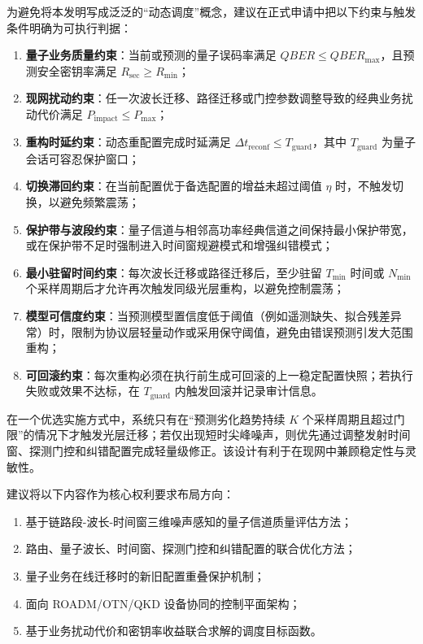 \documentclass[12pt,a4paper]{article}
\begin{document}
为避免将本发明写成泛泛的“动态调度”概念，建议在正式申请中把以下约束与触发条件明确为可执行判据：
\begin{enumerate}[label=(\arabic*)]
    \item \textbf{量子业务质量约束}：当前或预测的量子误码率满足 $QBER \leq QBER_{\max}$，且预测安全密钥率满足 $R_{\mathrm{sec}} \geq R_{\min}$；
    \item \textbf{现网扰动约束}：任一次波长迁移、路径迁移或门控参数调整导致的经典业务扰动代价满足 $P_{\mathrm{impact}} \leq P_{\max}$；
    \item \textbf{重构时延约束}：动态重配置完成时延满足 $\Delta t_{\mathrm{reconf}} \leq T_{\mathrm{guard}}$，其中 $T_{\mathrm{guard}}$ 为量子会话可容忍保护窗口；
    \item \textbf{切换滞回约束}：在当前配置优于备选配置的增益未超过阈值 $\eta$ 时，不触发切换，以避免频繁震荡；
    \item \textbf{保护带与波段约束}：量子信道与相邻高功率经典信道之间保持最小保护带宽，或在保护带不足时强制进入时间窗规避模式和增强纠错模式；
    \item \textbf{最小驻留时间约束}：每次波长迁移或路径迁移后，至少驻留 $T_{\min}$ 时间或 $N_{\min}$ 个采样周期后才允许再次触发同级光层重构，以避免控制震荡；
    \item \textbf{模型可信度约束}：当预测模型置信度低于阈值（例如遥测缺失、拟合残差异常）时，限制为协议层轻量动作或采用保守阈值，避免由错误预测引发大范围重构；
    \item \textbf{可回滚约束}：每次重构必须在执行前生成可回滚的上一稳定配置快照；若执行失败或效果不达标，在 $T_{\mathrm{guard}}$ 内触发回滚并记录审计信息。
\end{enumerate}

在一个优选实施方式中，系统只有在“预测劣化趋势持续 $K$ 个采样周期且超过门限”的情况下才触发光层迁移；若仅出现短时尖峰噪声，则优先通过调整发射时间窗、探测门控和纠错配置完成轻量级修正。该设计有利于在现网中兼顾稳定性与灵敏性。

建议将以下内容作为核心权利要求布局方向：
\begin{enumerate}[label=(\arabic*)]
    \item 基于链路段-波长-时间窗三维噪声感知的量子信道质量评估方法；
    \item 路由、量子波长、时间窗、探测门控和纠错配置的联合优化方法；
    \item 量子业务在线迁移时的新旧配置重叠保护机制；
    \item 面向 ROADM/OTN/QKD 设备协同的控制平面架构；
    \item 基于业务扰动代价和密钥率收益联合求解的调度目标函数。
\end{enumerate}
\end{document}
